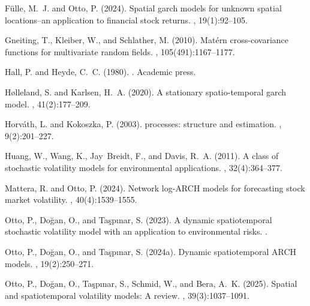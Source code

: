 \documentclass[fleqn,11pt]{article}
\begin{document}
\begin{thebibliography}{}
	F{\"u}lle, M.~J. and Otto, P. (2024).
	\newblock Spatial garch models for unknown spatial locations--an application to
	financial stock returns.
	, 19(1):92--105.
	
	Gneiting, T., Kleiber, W., and Schlather, M. (2010).
	\newblock Mat{\'e}rn cross-covariance functions for multivariate random fields.
	,
	105(491):1167--1177.
	
	Hall, P. and Heyde, C.~C. (1980).
	.
	\newblock Academic press.
	
	H{\o}lleland, S. and Karlsen, H.~A. (2020).
	\newblock A stationary spatio-temporal garch model.
	, 41(2):177--209.
	
	Horváth, L. and Kokoszka, P. (2003).
	 processes: structure and estimation.
	, 9(2):201--227.
	
	Huang, W., Wang, K., Jay~Breidt, F., and Davis, R.~A. (2011).
	\newblock A class of stochastic volatility models for environmental
	applications.
	, 32(4):364--377.
	
	Mattera, R. and Otto, P. (2024).
	\newblock Network log-{ARCH} models for forecasting stock market volatility.
	, 40(4):1539--1555.
	
	Otto, P., Do{\u{g}}an, O., and Ta{\c{s}}p{\i}nar, S. (2023).
	\newblock A dynamic spatiotemporal stochastic volatility model with an
	application to environmental risks.
	.
	
	Otto, P., Do{\u{g}}an, O., and Ta{\c{s}}p{\i}nar, S. (2024a).
	\newblock Dynamic spatiotemporal {ARCH} models.
	, 19(2):250--271.
	
	Otto, P., Do{\u{g}}an, O., Ta{\c{s}}p{\i}nar, S., Schmid, W., and Bera, A.~K.
	(2025).
	\newblock Spatial and spatiotemporal volatility models: A review.
	, 39(3):1037--1091.
	

\end{thebibliography}
\end{document}
